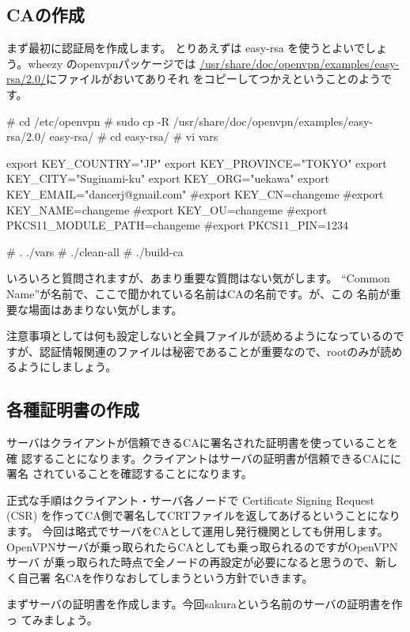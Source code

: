 \documentclass[mingoth,a4paper]{jsarticle}
\begin{document}
\subsection{CAの作成}

まず最初に認証局を作成します。
とりあえずは easy-rsa を使うとよいでしょう。wheezy のopenvpnパッケージでは
\url{/usr/share/doc/openvpn/examples/easy-rsa/2.0/}にファイルがおいてありそれ
をコピーしてつかえということのようです。

\begin{commandline}
 # cd /etc/openvpn
 # sudo cp -R /usr/share/doc/openvpn/examples/easy-rsa/2.0/ easy-rsa/
 # cd easy-rsa/
 # vi vars

export KEY_COUNTRY="JP"
export KEY_PROVINCE="TOKYO"
export KEY_CITY="Suginami-ku"
export KEY_ORG="uekawa"
export KEY_EMAIL="dancerj@gmail.com"
#export KEY_CN=changeme
#export KEY_NAME=changeme
#export KEY_OU=changeme
#export PKCS11_MODULE_PATH=changeme
#export PKCS11_PIN=1234

 # . ./vars
 # ./clean-all
 # ./build-ca
 
\end{commandline}

いろいろと質問されますが、あまり重要な質問はない気がします。
``Common Name''が名前で、ここで聞かれている名前はCAの名前です。が、この
名前が重要な場面はあまりない気がします。

注意事項としては何も設定しないと全員ファイルが読めるようになっているので
すが、認証情報関連のファイルは秘密であることが重要なので、rootのみが読め
るようにしましょう。

\subsection{各種証明書の作成}

サーバはクライアントが信頼できるCAに署名された証明書を使っていることを確
認することになります。クライアントはサーバの証明書が信頼できるCAにに署名
されていることを確認することになります。

正式な手順はクライアント・サーバ各ノードで Certificate Signing Request
(CSR) を作ってCA側で署名してCRTファイルを返してあげるということになります。
今回は略式でサーバをCAとして運用し発行機関としても併用します。
OpenVPNサーバが乗っ取られたらCAとしても乗っ取られるのですがOpenVPNサーバ
が乗っ取られた時点で全ノードの再設定が必要になると思うので、新しく自己署
名CAを作りなおしてしまうという方針でいきます。

まずサーバの証明書を作成します。今回sakuraという名前のサーバの証明書を作っ
てみましょう。
\end{document}
